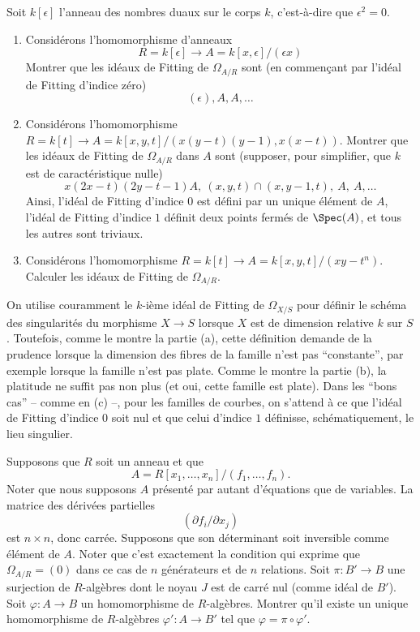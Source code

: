 \begin{exercise}
\label{exercise-dual-numbers}
Soit $k[\epsilon]$ l'anneau des nombres duaux
sur le corps $k$, c'est-à-dire que $\epsilon^2 = 0$.
\begin{enumerate}
\item Considérons l'homomorphisme d'anneaux
$$
R = k[\epsilon] \to A = k[x, \epsilon]/(\epsilon x)
$$
Montrer que les idéaux de Fitting de $\Omega_{A/R}$ sont (en commençant par
l'idéal de Fitting d'indice zéro)
$$
(\epsilon), A, A, \ldots
$$
\item Considérons l'homomorphisme $R = k[t] \to
A = k[x, y, t]/(x(y-t)(y-1), x(x-t))$. Montrer que les idéaux de Fitting de
$\Omega_{A/R}$ dans $A$ sont (supposer, pour simplifier, que $k$ est de caractéristique
nulle)
$$
x(2x-t)(2y-t-1)A, \ (x, y, t)\cap (x, y-1, t), \ A, \ A, \ldots
$$
Ainsi, l'idéal de Fitting d'indice $0$ est défini par un unique élément de $A$,
l'idéal de Fitting d'indice $1$ définit deux points fermés de $\Spec(A)$, et
tous les autres sont triviaux.
\item Considérons l'homomorphisme $R = k[t] \to A = k[x, y, t]/(xy-t^n)$.
Calculer les idéaux de Fitting de $\Omega_{A/R}$.
\end{enumerate}
\end{exercise}

\begin{remark}
\label{remark-fitting-omega-not-sings}
On utilise couramment le $k$-ième idéal de Fitting de $\Omega_{X/S}$
pour définir le schéma des singularités du morphisme $X \to S$ lorsque $X$ est de dimension relative
$k$ sur $S$. Toutefois, comme le montre la partie (a), cette définition demande de la prudence
lorsque la dimension des fibres de la famille n'est pas ``constante'', par exemple lorsque
la famille n'est pas plate. Comme le montre la partie (b), la platitude ne suffit pas non plus
(et oui, cette famille est plate). Dans les ``bons cas'' -- comme en (c) --, pour les
familles de courbes, on s'attend à ce que l'idéal de Fitting d'indice $0$ soit nul et
que celui d'indice $1$ définisse, schématiquement, le lieu singulier.
\end{remark}

\begin{exercise}
\label{exercise-formally-smooth}
Supposons que $R$ soit un anneau et que
$$
A = R[x_1, \ldots, x_n]/(f_1, \ldots, f_n).
$$
Noter que nous supposons $A$ présenté par autant
d'équations que de variables. La matrice des dérivées
partielles
$$
( \partial f_i / \partial x_j )
$$
est $n \times n$, donc carrée. Supposons que
son déterminant soit inversible comme élément de $A$. Noter que
c'est exactement la condition qui exprime que $\Omega_{A/R} = (0)$
dans ce cas de $n$ générateurs et de $n$ relations.
Soit $\pi : B' \to B$ une surjection de $R$-algèbres
dont le noyau $J$ est de carré nul (comme idéal de $B'$).
Soit $\varphi : A \to B$ un homomorphisme de $R$-algèbres.
Montrer qu'il existe un unique homomorphisme de $R$-algèbres
$\varphi' : A \to B'$ tel que $\varphi = \pi \circ \varphi'$.
\end{exercise}

